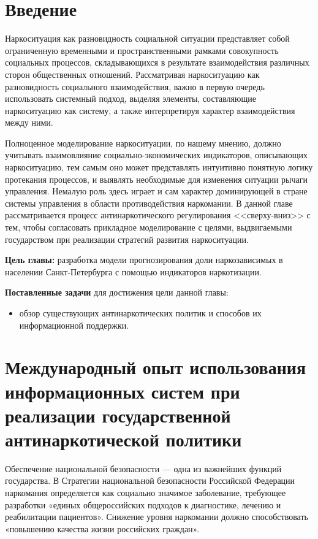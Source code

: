 \section*{Введение}

Наркоситуация как разновидность социальной ситуации представляет собой 
ограниченную временными и пространственными рамками совокупность социальных 
процессов, складывающихся в результате взаимодействия различных сторон 
общественных отношений.  Рассматривая наркоситуацию как разновидность 
социального взаимодействия, важно в первую очередь использовать системный 
подход, выделяя элементы, составляющие наркоситуацию как систему, а также 
интерпретируя характер взаимодействия между ними.

Полноценное моделирование наркоситуации, по нашему мнению, должно учитывать 
взаимовлияние социально-экономических индикаторов, описывающих наркоситуацию, 
тем самым оно может представлять интуитивно понятную логику протекания 
процессов, и выявлять необходимые для изменения ситуации рычаги управления.  
Немалую роль здесь играет и сам характер доминирующей в стране системы 
управления в области противодействия наркомании.  В данной главе 
рассматривается процесс антинаркотического регулирования <<сверху-вниз>> с тем, 
чтобы согласовать прикладное моделирование с целями, выдвигаемыми государством 
при реализации стратегий развития наркоситуации.

\textbf{Цель главы:} разработка модели прогнозирования доли наркозависимых в 
населении Санкт-Петербурга с помощью индикаторов наркотизации.

\textbf{Поставленные задачи} для достижения цели данной главы:
\begin{itemize}
    \item обзор существующих антинаркотических политик и способов их 
        информационной поддержки.
\end{itemize} 



\section{Международный опыт использования информационных систем при реализации 
    государственной антинаркотической политики}

Обеспечение национальной безопасности — одна из важнейших функций государства.  
В Стратегии национальной безопасности Российской Федерации 
\cite{ru_nat_def_strat} наркомания определяется как социально значимое 
заболевание, требующее разработки «единых общероссийских подходов к диагностике, 
лечению и реабилитации пациентов».  Снижение уровня наркомании должно 
способствовать «повышению качества жизни российских граждан».

